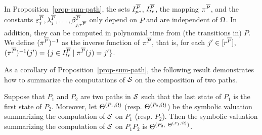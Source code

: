 In Proposition~\ref{prop-sum-path}, the sets $I^{\overline{P}}_{pe}$, $I^{\overline{P}}_{tr}$, the mapping $\pi^{\overline{P}}$, and the constants $\varepsilon^{\overline{P}}_j,\lambda^{\overline{P}}_j, \dots, \beta^{\overline{P}}_{j,r^{\overline{P}}}$ only depend on $P$ and are independent of $\Omega$. In addition, they can be computed in polynomial time from (the transitions in) $P$.
We define $(\pi^{\overline{P}})^{-1}$ as the inverse function of $\pi^{\overline{P}}$, that is, for each $j' \in [r^{\overline{P}}]$, $(\pi^{\overline{P}})^{-1}(j')=\{j \in I^{\overline{P}}_{tr}  \mid \pi^{\overline{P}}(j)= j'\}$. 

As a corollary of Proposition~\ref{prop-sum-path}, the following result demonstrates how to summarize the computations of ${\mathcal{S} }$ on the composition of two paths.

\begin{corollary}\label{cor-comp-two-paths}
Suppose that $P_1$ and $P_2$ are two paths in ${\mathcal{S} }$ such that the last state of $P_1$ is the first state of $P_2$. Moreover, let $\Theta^{(P_1, \Omega)}$ (resp. $\Theta^{(P_2, \Omega)}$) be the symbolic valuation summarizing the computation of ${\mathcal{S} }$ on $P_1$ (resp. $P_2$). Then the symbolic valuation summarizing the computation of ${\mathcal{S} }$ on $P_1 P_2$ is $\sumf^{(P_2,\ \sumf^{(P_1,\initval)})}$.
\end{corollary}

